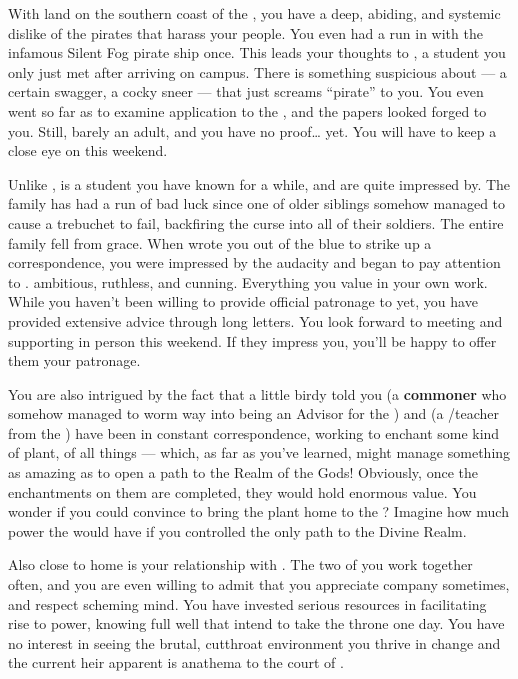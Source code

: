\documentclass[char]{GL2020}
\begin{document}
With land on the southern coast of the \pFarm{}, you have a deep, abiding, and systemic dislike of the pirates that harass your people. You even had a run in with the infamous Silent Fog pirate ship once. This leads your thoughts to \cPirateChild{\full}, a student you only just met after arriving on campus. There is something suspicious about \cPirateChild{\them} — a certain swagger, a cocky sneer — that just screams ``pirate'' to you. You even went so far as to examine \cPirateChild{\their} application to the \pSc{}, and the papers looked forged to you. Still, \cPirateChild{\they} \cPirateChild{\are} barely an adult, and you have no proof\ldots{} yet. You will have to keep a close eye on \cPirateChild{\them} this weekend.

Unlike \cPirateChild{}, \cLibAssist{} is a student you have known for a while, and are quite impressed by. The \cLibAssist{\formal} family has had a run of bad luck since one of \cLibAssist{\their} older siblings somehow managed to cause a trebuchet to fail, backfiring the curse into all of their soldiers. The entire family fell from grace. When \cLibAssist{} wrote you out of the blue to strike up a correspondence, you were impressed by the audacity and began to pay attention to \cLibAssist{\them}. \cLibAssist{\They} \cLibAssist{\are} ambitious, ruthless, and cunning. Everything you value in your own work. While you haven’t been willing to provide official patronage to \cLibAssist{} yet, you have provided extensive advice through long letters. You look forward to meeting and supporting \cLibAssist{\them} in person this weekend. If they impress you, you’ll be happy to offer them your patronage.

You are also intrigued by the fact that a little birdy told you \cCurse{\full} (a \textbf{commoner} who somehow managed to worm \cCurse{\their} way into being an Advisor for the \pFarm{}) and \cFlowPriest{\full} (a \cFlowPriest{\cleric}/teacher from the \pShip{}) have been in constant correspondence, working to enchant some kind of plant, of all things — which, as far as you've learned, might manage something as amazing as to open a path to the Realm of the Gods! Obviously, once the enchantments on them are completed, they would hold enormous value. You wonder if you could convince \cCurse{} to bring the plant home to the \pFarm{}? Imagine how much power the \pFarm{} would have if you controlled the only path to the Divine Realm. 

Also close to home is your relationship with \cPrince{\full}. The two of you work together often, and you are even willing to admit that you appreciate \cPrince{\their} company sometimes, and respect \cPrince{\their} scheming mind. You have invested serious resources in facilitating \cPrince{\their} rise to power, knowing full well that \cPrince{\they} intend\cPrince{\verbs} to take the throne one day. You have no interest in seeing the brutal, cutthroat environment you thrive in change and the current heir apparent is anathema to the court of \cQueen{\full}.  
\end{document}
